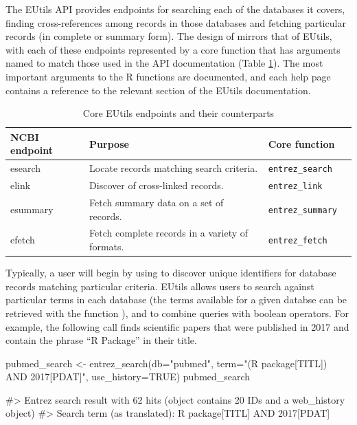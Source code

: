The EUtils API provides endpoints for searching each of the databases it covers, 
finding cross-references among records in those databases and fetching 
particular records (in complete or summary form). The design of  
mirrors that of EUtils, with each of these endpoints represented by a core
function that has arguments named to match those used in the API documentation
(Table \ref{tab:core-ends}). The most important arguments to the R functions are
documented, and each help page contains a reference to the relevant section of 
the EUtils documentation.

\begin{table}[]
\centering
\caption{Core EUtils endpoints and their  counterparts}
\label{tab:core-ends}
\begin{tabular}{llll}
\hline
NCBI endpoint & Purpose                                         & Core function            \\ \hline
esearch       & Locate records matching search criteria.        & \texttt{entrez\_search}  \\
elink         & Discover of cross-linked records.               & \texttt{entrez\_link}    \\ 
esummary      & Fetch summary data on a set of records.         & \texttt{entrez\_summary} \\ 
efetch        & Fetch complete records in a variety of formats. & \texttt{entrez\_fetch}   \\ \hline
\end{tabular}
\end{table}


Typically, a user will begin by using  to discover unique
identifiers for database records matching particular criteria. EUtils allows
users to search against particular terms in each database (the terms available
for a given databse can be retrieved with the function
), and to combine queries with boolean operators. 
For example, the following call finds scientific papers that were published in 2017 
and contain the phrase ``R Package'' in their title.

\begin{example}
pubmed_search <- entrez_search(db="pubmed", 
                               term="(R package[TITL]) AND 2017[PDAT]", 
                               use_history=TRUE)
pubmed_search

#> Entrez search result with 62 hits (object contains 20 IDs and a web_history object)
#>  Search term (as translated):  R package[TITL] AND 2017[PDAT]
\end{example}

